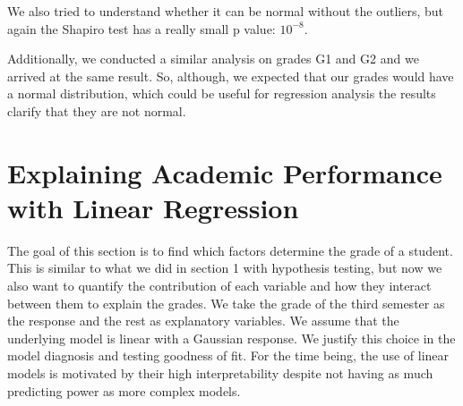 \documentclass[a4paper, 11pt]{article}
\theoremstyle{definition}
\numberwithin{equation}{section}		%
\numberwithin{table}{section}				%
\begin{document}
We also tried to understand whether it can be normal without the outliers, but again the Shapiro test has a really small p value: $10^{-8}$.

Additionally, we conducted a similar analysis on grades G1 and G2 and we arrived at the same result. So, although, we expected that our grades would
have a normal distribution, which could be useful for regression analysis
the results clarify that they are not normal.

\newpage
\section{Explaining Academic Performance with Linear Regression}
The goal of this section is to find which factors determine the grade of a student. This is similar to what we did in section 1 with hypothesis testing, but now we also want to quantify the contribution of each variable and how they interact between them to explain the grades. We take the grade of the third semester as the response and the rest as explanatory variables. We assume that the underlying model is linear with a Gaussian response. We justify this choice in the model diagnosis and testing goodness of fit. For the time being, the use of linear models is motivated by their high interpretability despite not having as much predicting power as more complex models. \bigskip
\end{document}
